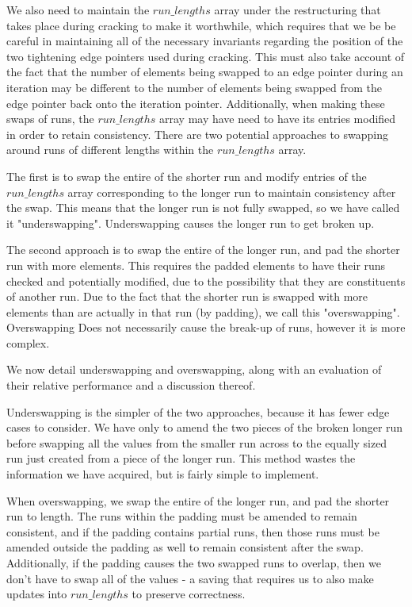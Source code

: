 We also need to maintain the $run\_lengths$ array under the restructuring that takes place during
cracking to make it worthwhile, which requires that we be be careful in maintaining all of the
necessary invariants regarding the position of the two tightening edge pointers used during cracking.
This must also take account of the fact that the number of elements being swapped to an edge
pointer during an iteration may be different to the number of elements being swapped from the edge
pointer back onto the iteration pointer. Additionally, when making these swaps of runs, the
$run\_lengths$ array may have need to have its entries modified in order to retain consistency. There
are two potential approaches to swapping around runs of different lengths within the
$run\_lengths$ array.

The first is to swap the entire of the shorter run and modify entries of the $run\_lengths$ array
corresponding to the longer run to maintain consistency after the swap. This means that the longer
run is not fully swapped, so we have called it "underswapping". Underswapping causes the longer run
to get broken up.

The second approach is to swap the entire of the longer run, and pad the shorter run with more
elements. This requires the padded elements to have their runs checked and potentially modified, due
to the possibility that they are constituents of another run. Due to the fact that the shorter run is
swapped with more elements than are actually in that run (by padding), we call this "overswapping".
Overswapping Does not necessarily cause the break-up of runs, however it is more complex.

We now detail underswapping and overswapping, along with an evaluation of their relative performance
and a discussion thereof.


Underswapping is the simpler of the two approaches, because it has fewer edge cases to consider. We
have only to amend the two pieces of the broken longer run before swapping all the values from the
smaller run across to the equally sized run just created from a piece of the longer run. This method
wastes the information we have acquired, but is fairly simple to implement.


When overswapping, we swap the entire of the longer run, and pad the shorter run to length. The runs
within the padding must be amended to remain consistent, and if the padding contains partial runs,
then those runs must be amended outside the padding as well to remain consistent after the swap.
Additionally, if the padding causes the two swapped runs to overlap, then we don't have to swap all of
the values - a saving that requires us to also make updates into $run\_lengths$ to preserve
correctness.

